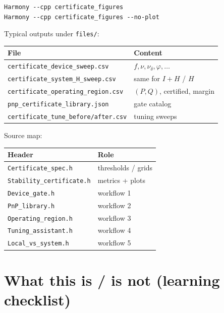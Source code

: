\documentclass[11pt,a4paper]{article}
\theoremstyle{definition}
\begin{document}
\begin{lstlisting}
Harmony --cpp certificate_figures
Harmony --cpp certificate_figures --no-plot
\end{lstlisting}

Typical outputs under \texttt{files/}:
\begin{center}
\begin{tabular}{@{}ll@{}}
\toprule
File & Content \\
\midrule
\texttt{certificate\_device\_sweep.csv} & $f,\nu,\nu_\delta,\varphi,\ldots$ \\
\texttt{certificate\_system\_H\_sweep.csv} & same for $I+H$ / $H$ \\
\texttt{certificate\_operating\_region.csv} & $(P,Q)$, certified, margin \\
\texttt{pnp\_certificate\_library.json} & gate catalog \\
\texttt{certificate\_tune\_before/after.csv} & tuning sweeps \\
\bottomrule
\end{tabular}
\end{center}

Source map:
\begin{center}
\begin{tabular}{@{}ll@{}}
\toprule
Header & Role \\
\midrule
\texttt{Certificate\_spec.h} & thresholds / grids \\
\texttt{Stability\_certificate.h} & metrics + plots \\
\texttt{Device\_gate.h} & workflow 1 \\
\texttt{PnP\_library.h} & workflow 2 \\
\texttt{Operating\_region.h} & workflow 3 \\
\texttt{Tuning\_assistant.h} & workflow 4 \\
\texttt{Local\_vs\_system.h} & workflow 5 \\
\bottomrule
\end{tabular}
\end{center}

\section{What this is / is not (learning checklist)}
\end{document}
